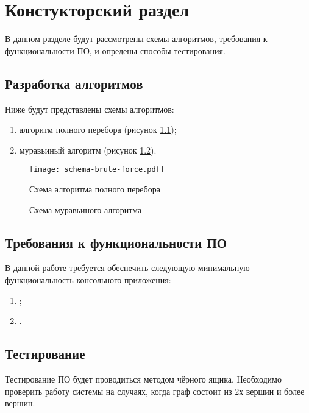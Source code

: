 \chapter{ Констукторский раздел}
\label{cha:design}
    В данном разделе будут рассмотрены схемы алгоритмов, требования к функциональности ПО,
    и опредены способы тестирования.
    
    \section{Разработка алгоритмов}
        Ниже будут представлены схемы алгоритмов: 
        \begin{enumerate}
            \item алгоритм полного перебора (рисунок \ref{schema:brute-force});
            \item муравьиный алгоритм (рисунок \ref{schema:ant}).
        \end{enumerate}

        \begin{figure}[h!]
            \centering
                \texttt{[image: schema-brute-force.pdf]}
                \caption{Схема алгоритма полного перебора}
                \label{schema:brute-force}
        \end{figure}

        \begin{figure}[h!]
            \centering
                \caption{Схема муравьиного алгоритма}
                \label{schema:ant}
        \end{figure}

    \section{Требования к функциональности ПО}
        В данной работе требуется обеспечить следующую минимальную функциональность консольного приложения:
        \begin{enumerate}
            \item ;
            \item .
        \end{enumerate}

    \section{Тестирование}
        Тестирование ПО будет проводиться методом чёрного ящика. 
        Необходимо проверить работу системы на случаях,
        когда граф состоит из 2х вершин и более вершин.

\newpage